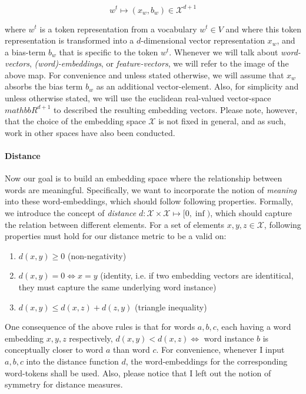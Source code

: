 \documentclass[a4paper,12pt,twoside,openright]{report}
\begin{document}
\begin{equation}
w^t \mapsto (x_w, b_w) \in \mathcal{X}^{d + 1}
\end{equation}{\label{map:embedding_mapping}}

where $w^t$ is a token representation from a vocabulary $w^t \in V$ and where this token representation is transformed into a $d$-dimensional vector representation $x_w$, and a bias-term $b_w$ that is specific to the token $w^t$.
Whenever we will talk about \textit{word-vectors}, \textit{(word)-embeddings}, or \textit{feature-vectors}, we will refer to the image of the above map. 
For convenience and unless stated otherwise, we will assume that $x_w$ absorbs the bias term $b_w$ as an additional vector-element.
Also, for simplicity and unless otherwise stated, we will use the euclidean real-valued vector-space $mathbb{R}^{d+1}$ to described the resulting embedding vectors.
Please note, however, that the choice of the embedding space $\mathcal{X}$ is not fixed in general, and as such, work in other spaces have also been conducted. 


\paragraph{Distance} Now our goal is to build an embedding space where the relationship between words are meaningful.
Specifically, we want to incorporate the notion of \textit{meaning} into these word-embeddings, which should follow following properties.
Formally, we introduce the concept of \textit{distance} $d : \mathcal{X}  \times \mathcal{X} \mapsto [ 0, \inf )$, which should capture the relation between different elements. 
For a set of elements $x, y, z \in \mathcal{X}$, following properties must hold for our distance metric to be a valid on:

\begin{enumerate}
\item $d(x, y) \geq 0$ (non-negativity)
\item $d(x, y) = 0 \iff x = y$ (identity, i.e. if two embedding vectors are identitical, they must capture the same underlying word instance)
\item $d(x, y) \leq d(x, z) + d(z, y)$ (triangle inequality)
\end{enumerate}{\label{def:distance}}

One consequence of the above rules is that for words $a, b, c$, each having a word embedding $x, y, z$ respectively, $d(x, y) < d(x, z) \iff $ word instance $b$ is conceptually closer to word $a$ than word $c$.
For convenience, whenever I input $a, b, c$ into the distance function $d$, the word-embeddings for the corresponding word-tokens shall be used.
Also, please notice that I left out the notion of symmetry for distance measures.
\end{document}
